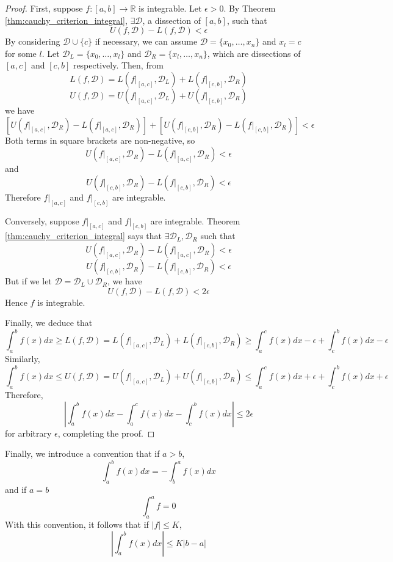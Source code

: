 \documentclass[10pt, a4paper, twoside]{report}
\begin{document}
\begin{proof}
    First, suppose \(f:[a,b]\to\mathbb{R}\) is integrable. Let \(\epsilon>0\). By Theorem \ref{thm:cauchy_criterion_integral}, \(\exists\mathcal{D}\), a dissection of \([a,b]\), such that 
    \[U(f,\mathcal{D})-L(f,\mathcal{D})<\epsilon\]
    By considering \(\mathcal{D}\cup\{c\}\) if necessary, we can assume \(\mathcal{D}=\{x_0,\ldots,x_n\}\) and \(x_l=c\) for some \(l\). Let \(\mathcal{D}_L=\{x_0,\ldots,x_l\}\) and \(\mathcal{D}_R=\{x_l,\ldots,x_n\}\), which are dissections of \([a,c]\) and \([c,b]\) respectively. Then, from
    \[L(f,\mathcal{D})=L(\left. f\right|_{[a,c]},\mathcal{D}_L)+L(\left. f\right|_{[c,b]},\mathcal{D}_R)\]
    \[U(f,\mathcal{D})=U(\left. f\right|_{[a,c]},\mathcal{D}_L)+U(\left. f\right|_{[c,b]},\mathcal{D}_R)\]
    we have 
    \[\left[U(\left. f\right|_{[a,c]},\mathcal{D}_R)-L(\left. f\right|_{[a,c]},\mathcal{D}_R)\right]+\left[U(\left. f\right|_{[c,b]},\mathcal{D}_R)-L(\left. f\right|_{[c,b]},\mathcal{D}_R)\right]<\epsilon\]
    Both terms in square brackets are non-negative, so 
    \[U(\left. f\right|_{[a,c]},\mathcal{D}_R)-L(\left. f\right|_{[a,c]},\mathcal{D}_R)<\epsilon\]
    and 
    \[U(\left. f\right|_{[c,b]},\mathcal{D}_R)-L(\left. f\right|_{[c,b]},\mathcal{D}_R)<\epsilon\]
    Therefore \(\left. f\right|_{[a,c]}\) and \(\left. f\right|_{[c,b]}\) are integrable.

    Conversely, suppose \(\left. f\right|_{[a,c]}\) and \(\left. f\right|_{[c,b]}\) are integrable. Theorem \ref{thm:cauchy_criterion_integral} says that \(\exists\mathcal{D}_L,\mathcal{D}_R\) such that 
    \[U(\left. f\right|_{[a,c]},\mathcal{D}_R)-L(\left. f\right|_{[a,c]},\mathcal{D}_R)<\epsilon\]
    \[U(\left. f\right|_{[c,b]},\mathcal{D}_R)-L(\left. f\right|_{[c,b]},\mathcal{D}_R)<\epsilon\]
    But if we let \(\mathcal{D}=\mathcal{D}_L\cup\mathcal{D}_R\), we have 
    \[U(f,\mathcal{D})-L(f,\mathcal{D})<2\epsilon\]
    Hence \(f\) is integrable.

    Finally, we deduce that 
    \[\int_a^bf(x)dx\geq L(f,\mathcal{D})=L(\left. f\right|_{[a,c]},\mathcal{D}_L)+L(\left. f\right|_{[c,b]},\mathcal{D}_R)\geq\int_a^cf(x)dx-\epsilon+\int_c^bf(x)dx-\epsilon\]
    Similarly,
    \[\int_a^bf(x)dx\leq U(f,\mathcal{D})=U(\left. f\right|_{[a,c]},\mathcal{D}_L)+U(\left. f\right|_{[c,b]},\mathcal{D}_R)\leq\int_a^cf(x)dx+\epsilon+\int_c^bf(x)dx+\epsilon\]
    Therefore,
    \[\left|\int_a^bf(x)dx-\int_a^cf(x)dx-\int_c^bf(x)dx\right|\leq 2\epsilon\]
    for arbitrary \(\epsilon\), completing the proof.
\end{proof}
Finally, we introduce a convention that if \(a>b\), 
\[\int_a^bf(x)dx=-\int_b^af(x)dx\]
and if \(a=b\)
\[\int_a^af=0\]
With this convention, it follows that if \(|f|\leq K\), 
\[\left|\int_a^bf(x)dx\right|\leq K|b-a|\]
\end{document}
